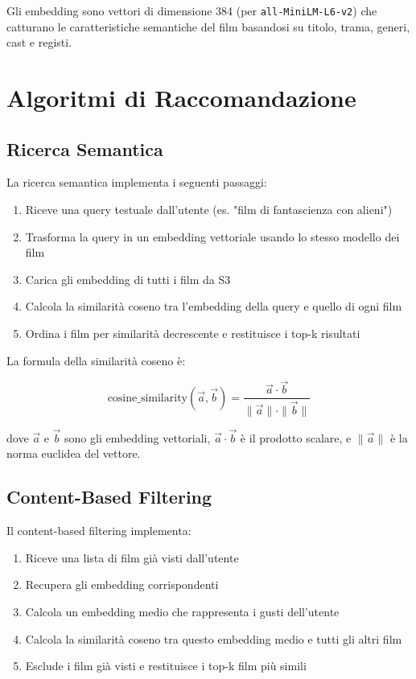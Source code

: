 \documentclass[11pt,a4paper]{article}
\begin{document}
Gli embedding sono vettori di dimensione 384 (per \texttt{all-MiniLM-L6-v2}) che catturano le caratteristiche semantiche del film basandosi su titolo, trama, generi, cast e registi.

\section{Algoritmi di Raccomandazione}
\subsection{Ricerca Semantica}
La ricerca semantica implementa i seguenti passaggi:

\begin{enumerate}
  \item Riceve una query testuale dall'utente (es. "film di fantascienza con alieni")
  \item Trasforma la query in un embedding vettoriale usando lo stesso modello dei film
  \item Carica gli embedding di tutti i film da S3
  \item Calcola la similarità coseno tra l'embedding della query e quello di ogni film
  \item Ordina i film per similarità decrescente e restituisce i top-k risultati
\end{enumerate}

La formula della similarità coseno è:

\begin{equation}
\text{cosine\_similarity}(\vec{a}, \vec{b}) = \frac{\vec{a} \cdot \vec{b}}{\|\vec{a}\| \cdot \|\vec{b}\|}
\end{equation}

dove $\vec{a}$ e $\vec{b}$ sono gli embedding vettoriali, $\vec{a} \cdot \vec{b}$ è il prodotto scalare, e $\|\vec{a}\|$ è la norma euclidea del vettore.

\subsection{Content-Based Filtering}
Il content-based filtering implementa:

\begin{enumerate}
  \item Riceve una lista di film già visti dall'utente
  \item Recupera gli embedding corrispondenti
  \item Calcola un embedding medio che rappresenta i gusti dell'utente
  \item Calcola la similarità coseno tra questo embedding medio e tutti gli altri film
  \item Esclude i film già visti e restituisce i top-k film più simili
\end{enumerate}
\end{document}
